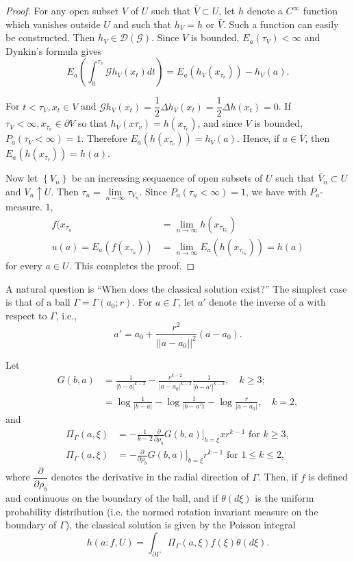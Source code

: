 \begin{proof}
For any open subset $V$ of $U$ such that $\bar{V} \subset U$, let
  $h$ denote a $C^\infty$ function which vanishes outside $U$ and such
  that $h_V = h$ or $\bar{V}$. Such a function can easily be
  constructed. Then $h_V \in \mathscr{D}(\mathscr{G})$. Since $V$ is
  bounded, $E_a (\tau_V) < \infty$ and Dynkin's formula gives 
  $$
  E_a \left(\int^{\tau_v}_0 \mathscr{G}h_V (x_t) dt\right) = E_a
  (h_V(x_{\tau_v})) - h_V(a). 
  $$

For $t < \tau_V, x_t \in V$ and $\mathscr{G}h_V(x_t) =
\dfrac{1}{2}\Delta h_V (x_t) = \dfrac{1}{2} \Delta h(x_t)= 0$. If
$\tau_V < \infty, x _{\tau_v} \in \partial V$ so that $h_V(x \tau_v) =
h(x_{\tau_v})$, and since $V$ is bounded, $P_a(\tau_V < \infty)
=1$. Therefore $E_a (h(x_{\tau_v})) = h_V(a)$. Hence, if $a \in
\bar{V}$, then $E_a (h(x_{\tau_v})) = h(a)$. 

Now let $\left\{V_n \right\}$ be an increasing sequaence of open
subsets of $U$ such that $\bar{V}_n \subset U$ and $V_n \uparrow
U$. Then $\tau_u = \lim\limits_{n- \infty} \tau_{V_n}$. Since $P_a
(\tau_u < \infty)=1$, we have with $P_a$-measure. $1$, 
\begin{align*}
  f(x_{\tau_u} & = \lim_{n \to \infty} h(x_{\tau_{V_n}}) \\
  u(a) = E_a (f(x_{\tau_u})) & = \lim_{n \to \infty} E_a (h(x_{\tau_{v_n}})) = h(a)
\end{align*}
for every $a \in U$. This completes the proof.
\end{proof}

A natural question is ``When does the classical solution exist?'' The
simplest case is that of a ball $\Gamma = \Gamma (a_0 ; r)$. For $a
\in \Gamma$, let $a'$ denote the inverse of a with respect to
$\Gamma$, i.e., 
$$
a' = a_0 +\frac{r^2}{||a-a_0||^2} (a-a_0).
$$\pageoriginale

Let
\begin{align*}
  G(b, a) & = \frac{1}{|b-a|^{k-2}}-\frac{r^{k-2}}{|a-a_0|^{k-2}}
  \frac{1}{|b-a'|^{k-2}},\quad k \geq 3; \\ 
  & = \log \frac{1}{| b-a|}- \log \frac{1}{| b-a'1}- \log
  \frac{r}{|a-a_0|},\quad k = 2, 
\end{align*}
and
\begin{align*}
  \Pi_\Gamma (a, \xi) &= - \frac{1}{k-2} \frac{\partial}{\partial
    \rho_b} G(b, a) \bigg ]_{b=\xi} x r^{k-1} \text{\ for\ } k \geq 3,\\ 
  \Pi_\Gamma (a, \xi) &= - \frac{\partial}{\partial \rho_b}  G(b, a)
  \bigg ]_{b= \xi} r^{k-1} \text{ for } 1 \leq k \leq 2, 
\end{align*}
where $\dfrac{\partial}{\partial \rho_b}$ denotes the derivative in
the radial direction of $\Gamma$. Then, if $f$ is defined and
continuous on the boundary of the ball, and if $\theta (d \xi)$ is the
uniform probability distribution (i.e. the normed rotation invariant
measure on the boundary of $\Gamma$), the classical solution is given
by the Poisson integral 
$$
h(a : f, U) = \int_{\partial \Gamma} \Pi_\Gamma (a, \xi) f (\xi) \theta (d \xi).
$$

